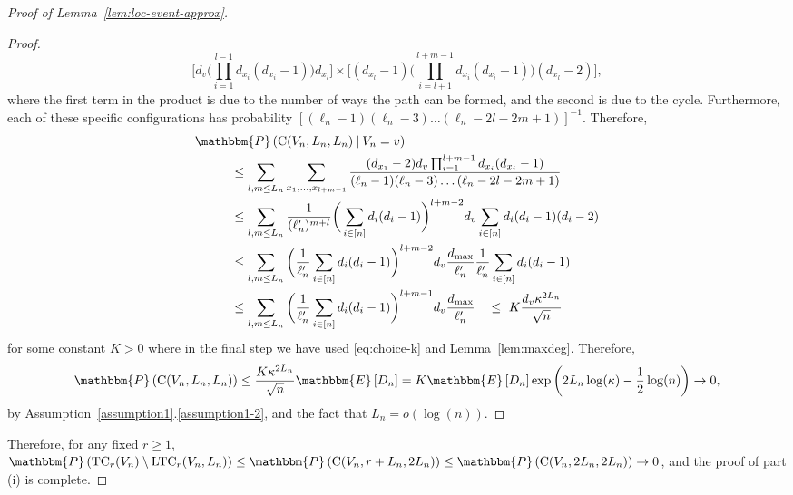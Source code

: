 \documentclass[11pt,a4paper, reqno]{article}
\newcommand\given[1][]{\:#1\vert\:}
\numberwithin{equation}{section}
\numberwithin{equation}{section}
\newcommand{\prob}[1]{\ensuremath{\mathbbm{P}\left(#1\right)}}
\newcommand{\expt}[1]{\ensuremath{\mathbbm{E}\left[#1\right]}}
\newcommand{\1}{\ensuremath{\mathbbm{1}}}
\newcommand{\TC}{\mathrm{TC}}
\newcommand{\LTC}{\mathrm{LTC}}
\newenvironment{claimproof}{\begin{proof}\renewcommand{\qedsymbol}{\claimqed}}{\end{proof}\renewcommand{\qedsymbol}{\plainqed}}
\let\plainqed\qedsymbol
\newcommand{\claimqed}{$\lrcorner$}
\numberwithin{equation}{section}
\numberwithin{theorem}{section}
\begin{document}
\begin{proof}[{Proof of Lemma~\ref{lem:loc-event-approx}}]
\begin{claimproof}
$$\bigg[d_v\bigg(\prod_{i=1}^{l-1}d_{x_i}(d_{x_i}-1)\bigg) d_{x_l}\bigg]\times \bigg[(d_{x_l}-1) \bigg(\prod_{i=l+1}^{l+m-1}d_{x_i}(d_{x_i}-1)\bigg)(d_{x_l}-2) \bigg],$$
where the first term in the product is due to the number of ways the path can be formed, and the second is due to the cycle.
Furthermore, each of these specific configurations has probability $[(\ell_n-1)(\ell_n-3)\dots(\ell_n-2l-2m+1)]^{-1}$.
Therefore,
 \begin{equation}
 \begin{split}
  &\prob{\mathrm{C}(V_n,L_n,L_n)\given V_n=v}\\
  & \hspace{1cm}\leq \sum_{l,m\leq L_n}\sum_{x_1,\dots,x_{l+m-1}}\dfrac{(d_{x_1}-2)d_v\prod_{i=1}^{l+m-1}d_{x_i}(d_{x_i}-1)}{(\ell_n-1)(\ell_n-3)\dots(\ell_n-2l-2m+1)}\\
  & \hspace{1cm}\leq \sum_{l,m\leq L_n}\frac{1}{(\ell_n')^{m+l}} \bigg(\sum_{i\in [n]}d_i(d_i-1)\bigg)^{l+m-2}d_v\sum_{i\in [n]}d_i(d_i-1)(d_i-2) \\
   & \hspace{1cm}\leq \sum_{l,m\leq L_n} \bigg(\frac{1}{\ell'_n}\sum_{i\in [n]}d_i(d_i-1)\bigg)^{l+m-2}d_v\frac{d_{\max}}{\ell_n'}\frac{1}{\ell_n'}\sum_{i\in [n]}d_i(d_i-1)\\
   & \hspace{1cm}\leq \sum_{l,m\leq L_n} \bigg(\frac{1}{\ell'_n}\sum_{i\in [n]}d_i(d_i-1)\bigg)^{l+m-1} d_v\frac{d_{\max}}{\ell_n'} %
\quad  \leq\  K \frac{d_v\kappa ^{2L_n}}{\sqrt{n}} 
  \end{split}
 \end{equation} 
 for some constant $K>0$ where
 in the final step we have used \eqref{eq:choice-k} and Lemma~\ref{lem:maxdeg}. 
 Therefore,
 \begin{equation}
 \prob{\mathrm{C}(V_n,L_n,L_n)}\leq \frac{K\kappa ^{2L_n}}{\sqrt{n}}\expt{D_n}= K\expt{D_n}\exp\left(2L_n\log(\kappa ) - \frac{1}{2}\log(n)\right)\to 0,
 \end{equation} 
 by Assumption~\ref{assumption1}.\ref{assumption1-2}, and the fact that $L_n=o(\log(n))$. 
\end{claimproof}
Therefore, for any fixed $r\geq 1$, $\prob{\TC_r(V_n)\setminus \LTC_r(V_n,L_n)}\leq \prob{\mathrm{C}(V_n,r+L_n,2L_n)}\leq \prob{\mathrm{C}(V_n,2L_n,2L_n)}\to 0$, and the proof of part (i) is complete.

\end{proof}
\end{document}
